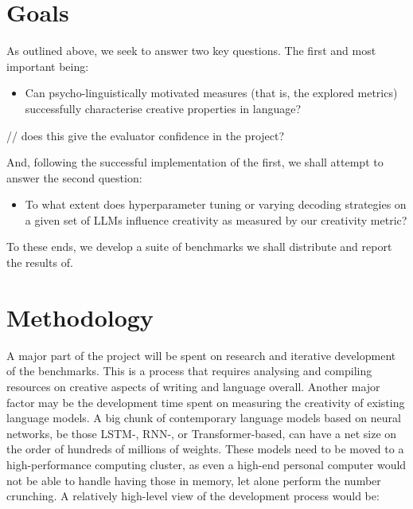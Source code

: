 \documentclass[a4paper,12pt]{article}
\begin{document}
\section*{Goals}

As outlined above, we seek to answer two key questions. The first and most important being:

\begin{itemize}
    \item Can psycho-linguistically motivated measures (that is, the explored metrics) successfully characterise creative properties in language?
\end{itemize}
// does this give the evaluator confidence in the project?

And, following the successful implementation of the first, we shall attempt to answer the second question:
\begin{itemize}
    \item To what extent does hyperparameter tuning or varying decoding strategies on a given set of LLMs influence creativity as measured by our creativity metric?
\end{itemize}

To these ends, we develop a suite of benchmarks we shall distribute and report the results of.




\section*{Methodology}
A major part of the project will be spent on research and iterative development of the benchmarks. This is a process that requires analysing and compiling resources on creative aspects of writing and language overall. Another major factor may be the development time spent on measuring the creativity of existing language models. A big chunk of contemporary language models based on neural networks, be those LSTM-, RNN-, or Transformer-based, can have a net size on the order of hundreds of millions of weights. These models need to be moved to a high-performance computing cluster, as even a high-end personal computer would not be able to handle having those in memory, let alone perform the number crunching. \newline A relatively high-level view of the development process would be:
\end{document}
